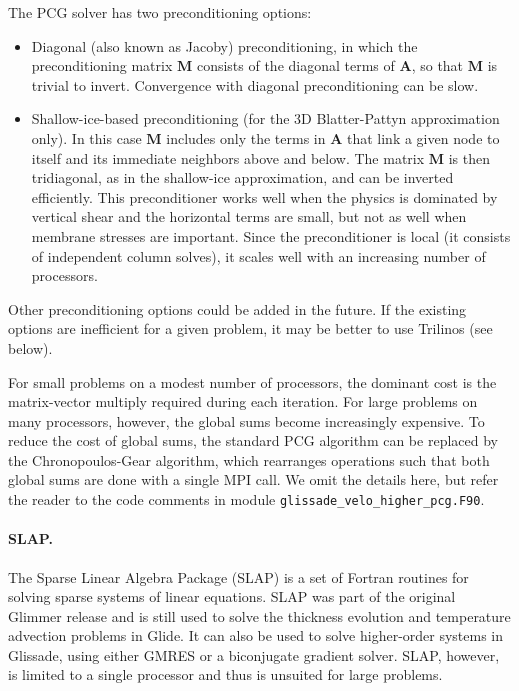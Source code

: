 {The PCG solver has two preconditioning options:

\begin{itemize}
\item Diagonal (also known as Jacoby) preconditioning, in which the preconditioning matrix $\mathbf{M}$ consists
of the diagonal terms of $\mathbf{A}$, so that $\mathbf{M}$ is trivial to invert.  Convergence with diagonal preconditioning 
can be slow.
\item Shallow-ice-based preconditioning (for the 3D Blatter-Pattyn approximation only).  
In this case $\mathbf{M}$ includes only the terms in $\mathbf{A}$
that link a given node to itself and its immediate neighbors above and below. The matrix $\mathbf{M}$ is then
tridiagonal, as in the shallow-ice approximation, and can be inverted efficiently. This preconditioner
works well when the physics is dominated by vertical shear and the horizontal terms are small, but not
as well when membrane stresses are important. Since the preconditioner is local (it consists of
independent column solves), it scales well with an increasing number of processors.
\end{itemize}

\noindent
Other preconditioning options could be added in the future. 
If the existing options are inefficient for a given problem, it may be better to use Trilinos (see below).

For small problems on a modest number of processors, the dominant cost is the matrix-vector
multiply required during each iteration.  For large problems on many processors, however, the global sums become
increasingly expensive.  To reduce the cost of global sums, the standard PCG algorithm can be
replaced by the Chronopoulos-Gear algorithm, which rearranges operations such that both global sums
are done with a single MPI call.  We omit the details here, but refer the reader
to the code comments in module \texttt{glissade\_velo\_higher\_pcg.F90}. 

\paragraph{SLAP.}

The Sparse Linear Algebra Package (SLAP) is a set of Fortran routines for solving sparse systems of linear
equations. SLAP was part of the original Glimmer release and is still used to solve the thickness evolution
and temperature advection problems in Glide.  It can also be used to solve higher-order systems in Glissade,
using either GMRES or a biconjugate gradient solver.
SLAP, however, is limited to a single processor and thus is unsuited for large problems.

}
